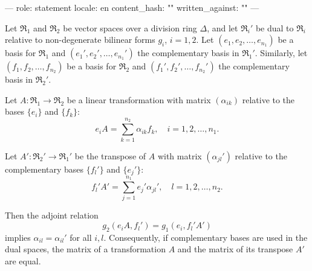 ---
role: statement
locale: en
content_hash: ""
written_against: ""
---

Let $\mathfrak{R}_1$ and $\mathfrak{R}_2$ be vector spaces over a division ring $\Delta$, and let $\mathfrak{R}_i'$ be dual to $\mathfrak{R}_i$ relative to non-degenerate bilinear forms $g_i$, $i = 1, 2$. Let $(e_1, e_2, \dots, e_{n_1})$ be a basis for $\mathfrak{R}_1$ and $(e_1', e_2', \dots, e_{n_1}')$ the complementary basis in $\mathfrak{R}_1'$. Similarly, let $(f_1, f_2, \dots, f_{n_2})$ be a basis for $\mathfrak{R}_2$ and $(f_1', f_2', \dots, f_{n_2}')$ the complementary basis in $\mathfrak{R}_2'$.

Let $A : \mathfrak{R}_1 \to \mathfrak{R}_2$ be a linear transformation with matrix $(\alpha_{ik})$ relative to the bases $\{e_i\}$ and $\{f_k\}$:
$$e_i A = \sum_{k=1}^{n_2} \alpha_{ik} f_k, \quad i = 1, 2, \dots, n_1.$$

Let $A' : \mathfrak{R}_2' \to \mathfrak{R}_1'$ be the transpose of $A$ with matrix $(\alpha_{jl}')$ relative to the complementary bases $\{f_l'\}$ and $\{e_j'\}$:
$$f_l' A' = \sum_{j=1}^{n_1} e_j' \alpha_{jl}', \quad l = 1, 2, \dots, n_2.$$

Then the adjoint relation
$$g_2(e_i A, f_l') = g_1(e_i, f_l' A')$$
implies $\alpha_{il} = \alpha_{il}'$ for all $i, l$. Consequently, if complementary bases are used in the dual spaces, the matrix of a transformation $A$ and the matrix of its transpose $A'$ are equal.
